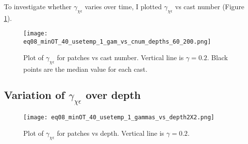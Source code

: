 \documentclass[11pt]{article}
\begin{document}
To investigate whether $\gamma_{\chi\epsilon}$ varies over time, I plotted $\gamma_{\chi\epsilon}$ vs cast number (Figure \ref{gamvscnum}).

\begin{figure}[htbp]
\texttt{[image: eq08\_minOT\_40\_usetemp\_1\_gam\_vs\_cnum\_depths\_60\_200.png]}
\caption{Plot of $\gamma_{\chi\epsilon}$ for patches vs cast number. Vertical line is $\gamma=0.2$. Black points are the median value for each cast.}
\label{gamvscnum}
\end{figure}




\clearpage
\subsection{Variation of $\gamma_{\chi\epsilon}$ over depth}

\begin{figure}[htbp]
\texttt{[image: eq08\_minOT\_40\_usetemp\_1\_gammas\_vs\_depth2X2.png]}
\caption{Plot of $\gamma_{\chi\epsilon}$ for patches vs depth. Vertical line is $\gamma=0.2$. }
\label{gamvsdepth}
\end{figure}
\end{document}
